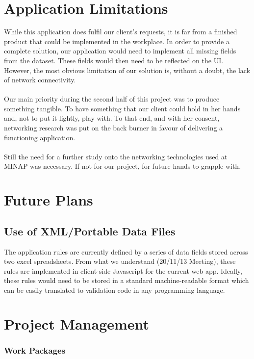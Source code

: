 \documentclass[12pt,a4paper,oneside,titlepage]{article}
\begin{document}
\section{Application Limitations}
While this application does fulfil our client's requests, it is far from a finished product that could be implemented in the workplace. In order to provide a complete solution, our application would need to implement all missing fields from the dataset. These fields would then need to be reflected on the UI. However, the most obvious limitation of our solution is, without a doubt, the lack of network connectivity.
\\ \\
Our main priority during the second half of this project was to produce something tangible. To have something that our client could hold in her hands and, not to put it lightly, play with. To that end, and with her consent, networking research was put on the back burner in favour of delivering a functioning application.
\\ \\
Still the need for a further study onto the networking technologies used at MINAP was necessary. If not for our project, for future hands to grapple with.
\newpage
\section{Future Plans}
\subsection{Use of XML/Portable Data Files}
The application rules are currently defined by a series of data fields stored across two excel spreadsheets. From what we understand (20/11/13 Meeting), these rules are implemented in client-side Javascript for the current web app. Ideally, these rules would need to be stored in a standard machine-readable format which can be easily translated to validation code in any programming language.

\newpage
\section{Project Management}


\subsubsection{Work Packages}
\end{document}

